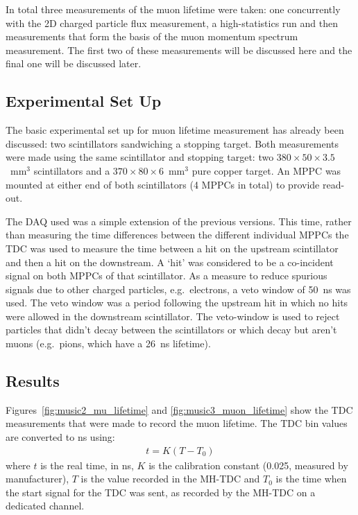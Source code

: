 In total three measurements of the muon lifetime were taken: one concurrently with the 2D charged particle flux measurement, a high-statistics run and then measurements that form the basis of the muon momentum spectrum measurement. The first two of these measurements will be discussed here and the final one will be discussed later.

\subsection{Experimental Set Up} %
\label{sec:experimental_set_up}
The basic experimental set up for muon lifetime measurement has already been discussed: two scintillators sandwiching a stopping target. Both measurements were made using the same scintillator and stopping target: two \( 380\times50\times3.5 \)~mm\(^3\) scintillators and a \( 370\times80\times6 \)~mm\(^3\) pure copper target. An MPPC was mounted at either end of both scintillators (4 MPPCs in total) to provide read-out.

The DAQ used was a simple extension of the previous versions. This time, rather than measuring the time differences between the different individual MPPCs the TDC was used to measure the time between a hit on the upstream scintillator and then a hit on the downstream. A `hit' was considered to be a co-incident signal on both MPPCs of that scintillator. As a measure to reduce spurious signals due to other charged particles, e.g.\ electrons, a veto window of 50~ns was used. The veto window was a period following the upstream hit in which no hits were allowed in the downstream scintillator. The veto-window is used to reject particles that didn't decay between the scintillators or which decay but aren't muons (e.g.\ pions, which have a 26~ns lifetime).

\subsection{Results} %
\label{sec:results} 
Figures~\ref{fig:music2_mu_lifetime} and \ref{fig:music3_muon_lifetime} show the TDC measurements that were made to record the muon lifetime. The TDC bin values are converted to ns using:
\begin{align}
  t = K(T - T_0)
\end{align}
where \(t\) is the real time, in ns, \(K\) is the calibration constant (0.025, measured by manufacturer), \(T\) is the value recorded in the MH-TDC and \(T_0\) is the time when the start signal for the TDC was sent, as recorded by the MH-TDC on a dedicated channel.

